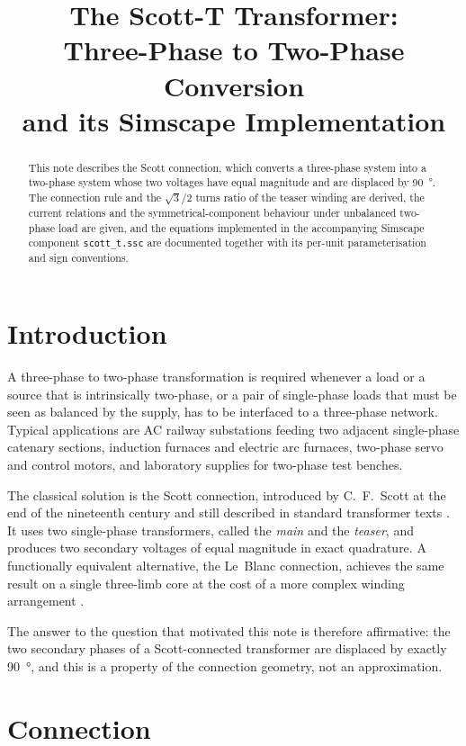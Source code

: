 \documentclass[11pt,a4paper]{article}
\title{The Scott-T Transformer:\\Three-Phase to Two-Phase Conversion\\and its Simscape Implementation}
\author{}
\date{}
\begin{document}
\maketitle

\begin{abstract}
This note describes the Scott connection, which converts a three-phase system
into a two-phase system whose two voltages have equal magnitude and are
displaced by \SI{90}{\degree}. The connection rule and the
$\sqrt{3}/2$ turns ratio of the teaser winding are derived, the current
relations and the symmetrical-component behaviour under unbalanced two-phase
load are given, and the equations implemented in the accompanying Simscape
component \texttt{scott\_t.ssc} are documented together with its per-unit
parameterisation and sign conventions.
\end{abstract}

\section{Introduction}

A three-phase to two-phase transformation is required whenever a load or a
source that is intrinsically two-phase, or a pair of single-phase loads that
must be seen as balanced by the supply, has to be interfaced to a three-phase
network. Typical applications are AC railway substations feeding two adjacent
single-phase catenary sections, induction furnaces and electric arc furnaces,
two-phase servo and control motors, and laboratory supplies for two-phase test
benches.

The classical solution is the Scott connection, introduced by C.~F.~Scott at
the end of the nineteenth century and still described in standard transformer
texts \cite{fitzgerald,winders}. It uses two single-phase transformers, called
the \emph{main} and the \emph{teaser}, and produces two secondary voltages of
equal magnitude in exact quadrature. A functionally equivalent alternative, the
Le~Blanc connection, achieves the same result on a single three-limb core at
the cost of a more complex winding arrangement \cite{chenguo}.

The answer to the question that motivated this note is therefore affirmative:
the two secondary phases of a Scott-connected transformer are displaced by
exactly \SI{90}{\degree}, and this is a property of the connection geometry, not
an approximation.

\section{Connection}
\end{document}
